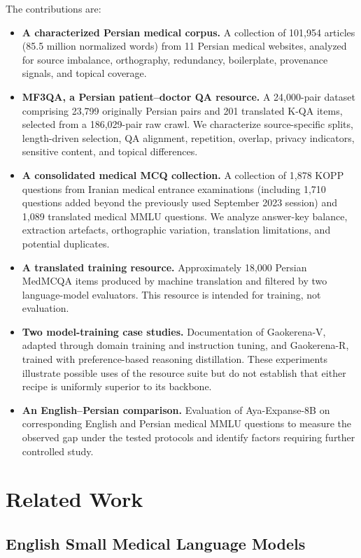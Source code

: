 \documentclass[manuscript,screen,review]{acmart}
\begin{document}
The contributions are:
\begin{itemize}
  \item \textbf{A characterized Persian medical corpus.} A collection of 101,954 articles (85.5 million normalized words) from 11 Persian medical websites, analyzed for source imbalance, orthography, redundancy, boilerplate, provenance signals, and topical coverage.
  \item \textbf{MF3QA, a Persian patient--doctor QA resource.} A 24,000-pair dataset comprising 23,799 originally Persian pairs and 201 translated K-QA items, selected from a 186,029-pair raw crawl. We characterize source-specific splits, length-driven selection, QA alignment, repetition, overlap, privacy indicators, sensitive content, and topical differences.
  \item \textbf{A consolidated medical MCQ collection.} A collection of 1,878 KOPP questions from Iranian medical entrance examinations (including 1,710 questions added beyond the previously used September 2023 session) and 1,089 translated medical MMLU questions. We analyze answer-key balance, extraction artefacts, orthographic variation, translation limitations, and potential duplicates.
  \item \textbf{A translated training resource.} Approximately 18,000 Persian MedMCQA items produced by machine translation and filtered by two language-model evaluators. This resource is intended for training, not evaluation.
  \item \textbf{Two model-training case studies.} Documentation of Gaokerena-V, adapted through domain training and instruction tuning, and Gaokerena-R, trained with preference-based reasoning distillation. These experiments illustrate possible uses of the resource suite but do not establish that either recipe is uniformly superior to its backbone.
  \item \textbf{An English--Persian comparison.} Evaluation of Aya-Expanse-8B on corresponding English and Persian medical MMLU questions to measure the observed gap under the tested protocols and identify factors requiring further controlled study.
\end{itemize}

\section{Related Work}\label{sec2}

\subsection{English Small Medical Language Models}\label{subsec2.1}
\end{document}

